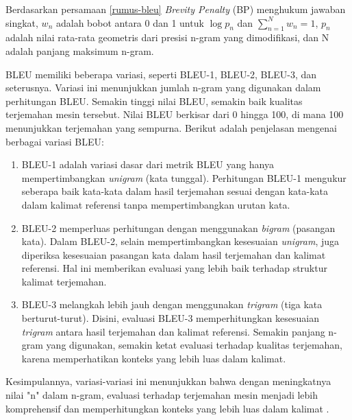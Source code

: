 \par Berdasarkan persamaan \ref{rumus-bleu} \textit{Brevity Penalty} (BP)  menghukum jawaban singkat, $w_n$ adalah bobot antara 0 dan 1 untuk $\log p_n$ dan $\sum_{n=1}^{N} w_n = 1$, $p_n$ adalah nilai rata-rata geometris dari presisi n-gram yang dimodifikasi, dan N adalah panjang maksimum n-gram.

\par BLEU memiliki beberapa variasi, seperti BLEU-1, BLEU-2, BLEU-3, dan seterusnya. Variasi ini menunjukkan jumlah n-gram yang digunakan dalam perhitungan BLEU. Semakin tinggi nilai BLEU, semakin baik kualitas terjemahan mesin tersebut. Nilai BLEU berkisar dari 0 hingga 100, di mana 100 menunjukkan terjemahan yang sempurna. Berikut adalah penjelasan mengenai berbagai variasi BLEU:

\begin{enumerate}

    \item BLEU-1 adalah variasi dasar dari metrik BLEU yang hanya mempertimbangkan \textit{unigram} (kata tunggal). Perhitungan BLEU-1 mengukur seberapa baik kata-kata dalam hasil terjemahan sesuai dengan kata-kata dalam kalimat referensi tanpa mempertimbangkan urutan kata.

    \item BLEU-2 memperluas perhitungan dengan menggunakan \textit{bigram} (pasangan kata). Dalam BLEU-2, selain mempertimbangkan kesesuaian \textit{unigram}, juga diperiksa kesesuaian pasangan kata dalam hasil terjemahan dan kalimat referensi. Hal ini memberikan evaluasi yang lebih baik terhadap struktur kalimat terjemahan.

    \item BLEU-3 melangkah lebih jauh dengan menggunakan \textit{trigram} (tiga kata berturut-turut). Disini, evaluasi BLEU-3 memperhitungkan kesesuaian \textit{trigram} antara hasil terjemahan dan kalimat referensi. Semakin panjang n-gram yang digunakan, semakin ketat evaluasi terhadap kualitas terjemahan, karena memperhatikan konteks yang lebih luas dalam kalimat.

\end{enumerate}

\par Kesimpulannya, variasi-variasi ini menunjukkan bahwa dengan meningkatnya nilai "n" dalam n-gram, evaluasi terhadap terjemahan mesin menjadi lebih komprehensif dan memperhitungkan konteks yang lebih luas dalam kalimat \citep{papineni2002bleu}.






